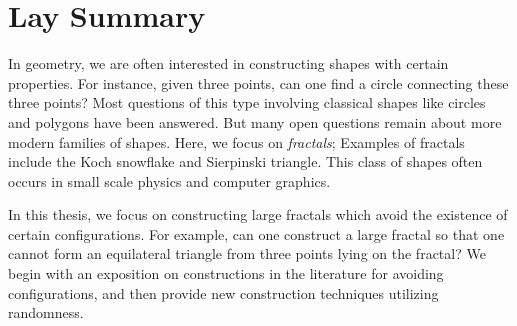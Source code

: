 


\chapter{Lay Summary}



In geometry, we are often interested in constructing shapes with certain properties. For instance, given three points, can one find a circle connecting these three points? Most questions of this type involving classical shapes like circles and polygons have been answered. But many open questions remain about more modern families of shapes. Here, we focus on \emph{fractals}; Examples of fractals include the Koch snowflake and Sierpinski triangle. This class of shapes often occurs in small scale physics and computer graphics.

In this thesis, we focus on constructing large fractals which avoid the existence of certain configurations. For example, can one construct a large fractal so that one cannot form an equilateral triangle from three points lying on the fractal? We begin with an exposition on constructions in the literature for avoiding configurations, and then provide new construction techniques utilizing randomness.